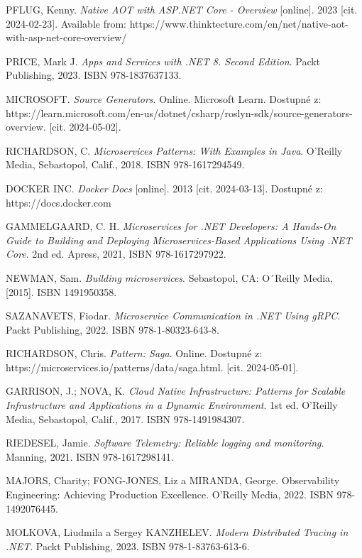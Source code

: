\documentclass[a4paper,12pt]{article}
\begin{document}
{%
PFLUG, Kenny. \emph{Native AOT with ASP.NET Core - Overview} [online]. 2023 [cit. 2024-02-23]. Available from: https://www.thinktecture.com/en/net/native-aot-with-asp-net-core-overview/

PRICE, Mark J. \emph{Apps and Services with .NET 8. Second Edition}. Packt Publishing, 2023. ISBN 978-1837637133.

MICROSOFT. \emph{Source Generators}. Online. Microsoft Learn. Dostupné z: https://learn.microsoft.com/en-us/dotnet/csharp/roslyn-sdk/source-generators-overview. [cit. 2024-05-02].

RICHARDSON, C. \emph{Microservices Patterns: With Examples in Java}. O'Reilly Media, Sebastopol, Calif., 2018. ISBN 978-1617294549.

DOCKER INC. \emph{Docker Docs} [online]. 2013 [cit. 2024-03-13]. Dostupné z: https://docs.docker.com

GAMMELGAARD, C. H. \emph{Microservices for .NET Developers: A Hands-On Guide to Building and Deploying Microservices-Based Applications Using .NET Core}. 2nd ed. Apress, 2021, ISBN 978-1617297922.

NEWMAN, Sam. \emph{Building microservices}. Sebastopol, CA: O´Reilly Media, [2015]. ISBN 1491950358.

SAZANAVETS, Fiodar. \emph{Microservice Communication in .NET Using gRPC}. Packt Publishing, 2022. ISBN 978-1-80323-643-8.

RICHARDSON, Chris. \emph{Pattern: Saga}. Online. Dostupné z: https://microservices.io/patterns/data/saga.html. [cit. 2024-05-01].

GARRISON, J.; NOVA, K. \emph{Cloud Native Infrastructure: Patterns for Scalable Infrastructure and Applications in a Dynamic Environment}. 1st ed. O'Reilly Media, Sebastopol, Calif., 2017. ISBN 978-1491984307.

RIEDESEL, Jamie. \emph{Software Telemetry: Reliable logging and monitoring}. Manning, 2021. ISBN 978-1617298141.

MAJORS, Charity; FONG-JONES, Liz a MIRANDA, George. Observability Engineering: Achieving Production Excellence. O'Reilly Media, 2022. ISBN 978-1492076445.

MOLKOVA, Liudmila a Sergey KANZHELEV. \emph{Modern Distributed Tracing in .NET}. Packt Publishing, 2023. ISBN 978-1-83763-613-6.

}
\end{document}
